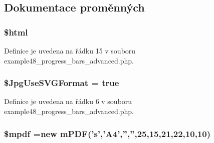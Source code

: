 \subsection{Dokumentace proměnných}
\hypertarget{example48__progress__bars__advanced_8php_a6f96e7fc92441776c9d1cd3386663b40}{
\subsubsection[{\$html}]{\setlength{\rightskip}{0pt plus 5cm}\$html}}\label{example48__progress__bars__advanced_8php_a6f96e7fc92441776c9d1cd3386663b40}


Definice je uvedena na řádku 15 v souboru example48\-\_\-progress\-\_\-bars\-\_\-advanced.\-php.

\hypertarget{example48__progress__bars__advanced_8php_a4767d5ef05aa1f95f7a64c0aa8f26ccc}{
\subsubsection[{\$\-Jpg\-Use\-S\-V\-G\-Format}]{\setlength{\rightskip}{0pt plus 5cm}\$Jpg\-Use\-S\-V\-G\-Format = true}}\label{example48__progress__bars__advanced_8php_a4767d5ef05aa1f95f7a64c0aa8f26ccc}


Definice je uvedena na řádku 6 v souboru example48\-\_\-progress\-\_\-bars\-\_\-advanced.\-php.

\hypertarget{example48__progress__bars__advanced_8php_ad028f81910d6cbab9b184d2214b3a8f8}{
\subsubsection[{\$mpdf}]{\setlength{\rightskip}{0pt plus 5cm}\$mpdf =new {\bf m\-P\-D\-F}('s','A4','','',25,15,21,22,10,10)}}\label{example48__progress__bars__advanced_8php_ad028f81910d6cbab9b184d2214b3a8f8}


